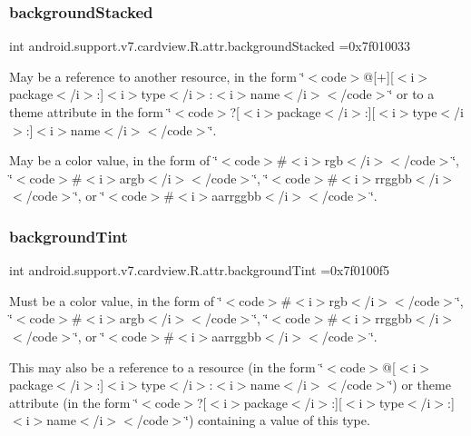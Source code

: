 \subsubsection{\texorpdfstring{background\+Stacked}{backgroundStacked}}
{\footnotesize\ttfamily int android.\+support.\+v7.\+cardview.\+R.\+attr.\+background\+Stacked =0x7f010033\hspace{0.3cm}{\ttfamily [static]}}

May be a reference to another resource, in the form \char`\"{}$<$code$>$@\mbox{[}+\mbox{]}\mbox{[}$<$i$>$package$<$/i$>$\+:\mbox{]}$<$i$>$type$<$/i$>$\+:$<$i$>$name$<$/i$>$$<$/code$>$\char`\"{} or to a theme attribute in the form \char`\"{}$<$code$>$?\mbox{[}$<$i$>$package$<$/i$>$\+:\mbox{]}\mbox{[}$<$i$>$type$<$/i$>$\+:\mbox{]}$<$i$>$name$<$/i$>$$<$/code$>$\char`\"{}. 

May be a color value, in the form of \char`\"{}$<$code$>$\#$<$i$>$rgb$<$/i$>$$<$/code$>$\char`\"{}, \char`\"{}$<$code$>$\#$<$i$>$argb$<$/i$>$$<$/code$>$\char`\"{}, \char`\"{}$<$code$>$\#$<$i$>$rrggbb$<$/i$>$$<$/code$>$\char`\"{}, or \char`\"{}$<$code$>$\#$<$i$>$aarrggbb$<$/i$>$$<$/code$>$\char`\"{}. \mbox{\label{classandroid_1_1support_1_1v7_1_1cardview_1_1R_1_1attr_ab937a9e918e0058bdb22175c79c80b62}} 
\subsubsection{\texorpdfstring{background\+Tint}{backgroundTint}}
{\footnotesize\ttfamily int android.\+support.\+v7.\+cardview.\+R.\+attr.\+background\+Tint =0x7f0100f5\hspace{0.3cm}{\ttfamily [static]}}

Must be a color value, in the form of \char`\"{}$<$code$>$\#$<$i$>$rgb$<$/i$>$$<$/code$>$\char`\"{}, \char`\"{}$<$code$>$\#$<$i$>$argb$<$/i$>$$<$/code$>$\char`\"{}, \char`\"{}$<$code$>$\#$<$i$>$rrggbb$<$/i$>$$<$/code$>$\char`\"{}, or \char`\"{}$<$code$>$\#$<$i$>$aarrggbb$<$/i$>$$<$/code$>$\char`\"{}. 

This may also be a reference to a resource (in the form \char`\"{}$<$code$>$@\mbox{[}$<$i$>$package$<$/i$>$\+:\mbox{]}$<$i$>$type$<$/i$>$\+:$<$i$>$name$<$/i$>$$<$/code$>$\char`\"{}) or theme attribute (in the form \char`\"{}$<$code$>$?\mbox{[}$<$i$>$package$<$/i$>$\+:\mbox{]}\mbox{[}$<$i$>$type$<$/i$>$\+:\mbox{]}$<$i$>$name$<$/i$>$$<$/code$>$\char`\"{}) containing a value of this type. \mbox{\label{classandroid_1_1support_1_1v7_1_1cardview_1_1R_1_1attr_afb91022bf77beda3662ed71a44e449a0}} 
